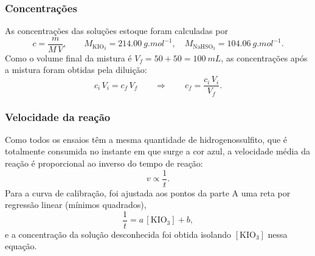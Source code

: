  \subsubsection{Concentrações}
 As concentrações das soluções estoque foram calculadas por
 \[
    c = \frac{m}{M\,V},
    \qquad
    M_{\mathrm{KIO_3}} = \SI{214,00}{g.mol^{-1}},
    \quad
    M_{\mathrm{NaHSO_3}} = \SI{104,06}{g.mol^{-1}}.
 \]
 Como o volume final da mistura é $V_f = 50 + 50 = \SI{100}{mL}$, as concentrações após a mistura foram obtidas pela diluição:
 \[
    c_i\,V_i = c_f\,V_f
    \qquad\Rightarrow\qquad
    c_f = \frac{c_i\,V_i}{V_f}.
 \]

 \subsubsection{Velocidade da reação}
 Como todos os ensaios têm a mesma quantidade de hidrogenossulfito, que é totalmente consumida no instante em que surge a cor azul, a velocidade média da reação é proporcional ao inverso do tempo de reação:
 \[
    v \propto \frac{1}{t}.
 \]
 Para a curva de calibração, foi ajustada aos pontos da parte A uma reta por regressão linear (mínimos quadrados),
 \[
    \frac{1}{t} = a\,[\mathrm{KIO_3}] + b,
 \]
 e a concentração da solução desconhecida foi obtida isolando $[\mathrm{KIO_3}]$ nessa equação.
